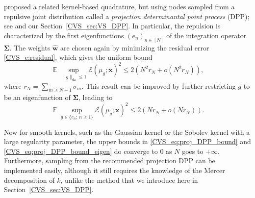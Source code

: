 \documentclass[twoside,11pt]{book}
\numberwithin{theorem}{chapter}
\numberwithin{definition}{chapter}
\numberwithin{proposition}{chapter}
\numberwithin{corollary}{chapter}
\numberwithin{example}{chapter}
\numberwithin{lemma}{chapter}
\numberwithin{assumption}{chapter}
\DeclareMathOperator{\EX}{\mathbb{E}}
\newcommand{\pc}[1]{\textcolor{blue}{#1}}
\newcommand{\rb}[1]{\textcolor{magenta}{#1}}
\begin{document}
\cite{BeBaCh19} proposed a related kernel-based quadrature, but using nodes sampled from a repulsive joint distribution called a \emph{projection determinantal point process} (DPP); see \citep{HoKrPeVi06} and our Section~\ref{CVS_sec:VS_DPP}. In particular, the repulsion is characterized by the first eigenfunctions $(e_{n})_{n \in [N]}$ of the integration operator $\bm{\Sigma}$. The weights $\hat{\bm{w}}$ are chosen again by minimizing the residual error \eqref{CVS_e:residual},
which gives the uniform bound
\begin{equation}\label{CVS_eq:proj_DPP_bound}
\EX \sup\limits_{\|g\|_{\mathrm{d}\omega} \leq 1} \mathcal{E}(\mu_{g}; \bm{x})^{2} \leq 2(N^{2} r_{N} + o(N^{2} r_{N})) ,
\end{equation}
where $r_{N} = \sum\limits_{m \geq N+1} \sigma_{m}$. This result can be improved by further restricting $g$ to be an eigenfunction of $\bm{\Sigma}$, leading to
\begin{equation}\label{CVS_eq:proj_DPP_bound_eigen}
\EX \sup\limits_{g \in \{e_{n};~ n\geq 1\}} \mathcal{E}(\mu_{g}; \bm{x})^{2} \leq 2(N r_{N} + o(N r_{N})).
\end{equation}

Now for smooth kernels, such as the Gaussian kernel or the Sobolev kernel with a large regularity parameter, the upper bounds in \eqref{CVS_eq:proj_DPP_bound} and \eqref{CVS_eq:proj_DPP_bound_eigen} do converge to $0$ as $N$ goes to $+\infty$. Furthermore, sampling from the recommended projection DPP can be implemented easily, although it still requires the knowledge of the Mercer decomposition of $k$, unlike the method that we introduce here in Section~\ref{CVS_sec:VS_DPP}.

\end{document}
